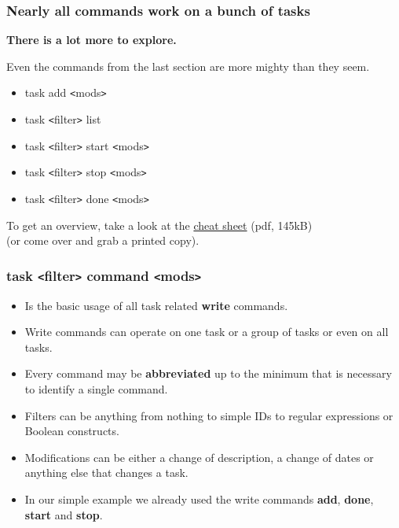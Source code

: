 \documentclass[t,handout]{beamer}
\begin{document}
\begin{frame}[fragile]\frametitle{Nearly all commands work on a bunch of tasks}
    \textbf{There is a lot more to explore.}

    Even the commands from the last section are more mighty than they seem. \pause

    \begin{itemize}
        \item task add {\tt<}mods{\tt>}
        \item task {\tt<}filter{\tt>} list
        \item task {\tt<}filter{\tt>} start {\tt<}mods{\tt>}
        \item task {\tt<}filter{\tt>} stop {\tt<}mods{\tt>}
        \item task {\tt<}filter{\tt>} done {\tt<}mods{\tt>}
    \end{itemize} \pause

    To get an overview, take a look at the \href{http://taskwarrior.org/download/task-2.5.1.ref.pdf}{cheat sheet} (pdf, 145kB) \\
    (or come over and grab a printed copy).
\end{frame}

\begin{frame}[fragile]\frametitle{task {\tt<}filter{\tt>} command {\tt<}mods{\tt>}}
    \begin{itemize}
        \item Is the basic usage of all task related \textbf{write} commands.
        \item Write commands can operate on one task or a group of tasks or even on all tasks.
        \item Every command may be \textbf{abbreviated} up to the minimum that is necessary to identify a single command.
        \item Filters can be anything from nothing to simple IDs to regular expressions or Boolean constructs.
        \item Modifications can be either a change of description, a change of dates or anything else that changes a task.
        \item In our simple example we already used the write commands \textbf{add}, \textbf{done}, \textbf{start} and \textbf{stop}.
    \end{itemize}
\end{frame}
\end{document}

